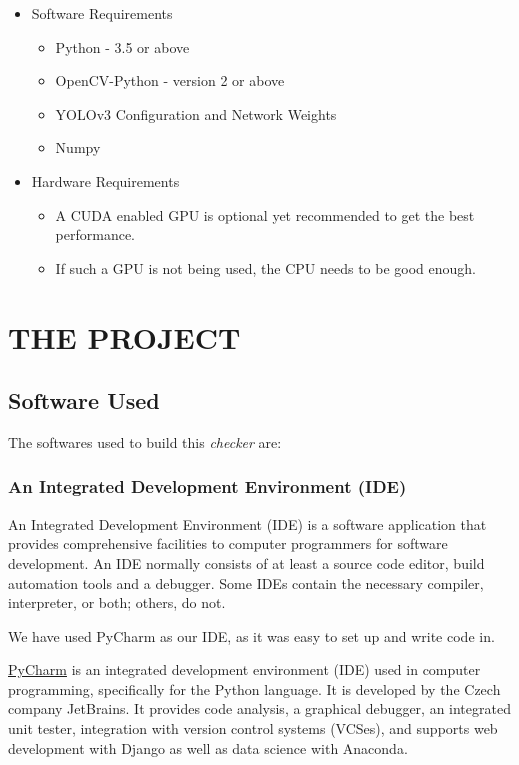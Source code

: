 \documentclass[a4paper]{article}
\begin{document}
\begin{itemize}
    \item Software Requirements
          \begin{itemize}
              \item Python - 3.5 or above
              \item OpenCV-Python - version 2 or above
              \item YOLOv3 Configuration and Network Weights
              \item Numpy
          \end{itemize}

    \item Hardware Requirements
          \begin{itemize}
              \item A CUDA enabled GPU is optional yet recommended to get the best performance.
              \item If such a GPU is not being used, the CPU needs to be good enough.
          \end{itemize}
\end{itemize}
\pagebreak

\section{THE PROJECT}
\subsection{Software Used}
The softwares used to build this \textit{checker} are:

\subsubsection{An Integrated Development Environment (IDE)}
An Integrated Development Environment (IDE) is a software application that provides comprehensive facilities to computer programmers for software
development. An IDE normally consists of at least a source code editor, build automation tools and a debugger. Some IDEs contain the necessary compiler,
interpreter, or both; others, do not.

We have used PyCharm as our IDE, as it was easy to set up and write code in.

\href{https://www.jetbrains.com/pycharm/}{PyCharm} is an integrated development environment (IDE) used in computer programming, specifically for the Python language. It is developed by the Czech company JetBrains. It provides code analysis, a graphical debugger, an integrated unit tester, integration with version control systems (VCSes), and supports web development with Django as well as data science with Anaconda.
\end{document}
